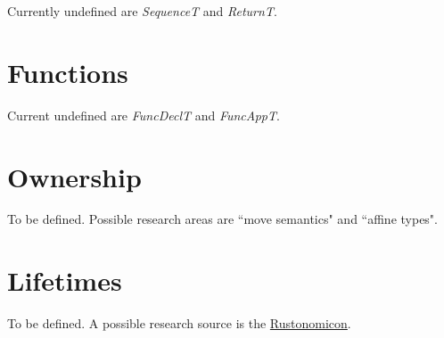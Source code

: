 \documentclass[11pt]{article}
\begin{document}
    \begin{flushleft}
        Currently undefined are \textit{SequenceT} and \textit{ReturnT}.
    \end{flushleft}

    \section*{Functions}
    Current undefined are \textit{FuncDeclT} and \textit{FuncAppT}.

    \section*{Ownership}
    To be defined. Possible research areas are ``move semantics" and ``affine types".

    \section*{Lifetimes}
    To be defined. A possible research source is the \href{https://doc.rust-lang.org/stable/nomicon/}{Rustonomicon}.
\end{document}
